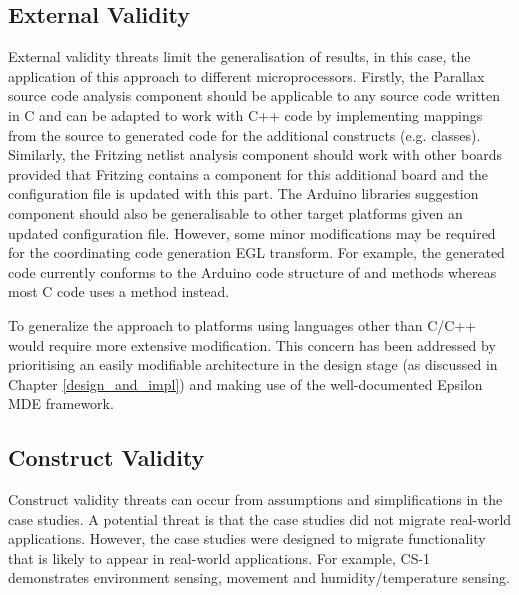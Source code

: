 \documentclass{UoYCSproject}
\begin{document}
\subsection{External Validity}
External validity threats limit the generalisation of results, in this case, the application of this approach to different microprocessors. Firstly, the Parallax source code analysis component should be applicable to any source code written in C and can be adapted to work with C++ code by implementing mappings from the source to generated code for the additional constructs (e.g. classes). Similarly, the Fritzing netlist analysis component should work with other boards provided that Fritzing contains a component for this additional board and the configuration file is updated with this part. The Arduino libraries suggestion component should also be generalisable to other target platforms given an updated configuration file. However, some minor modifications may be required for the coordinating code generation EGL transform. For example, the generated code currently conforms to the Arduino code structure of  and  methods whereas most C code uses a  method instead.

To generalize the approach to platforms using languages other than C/C++ would require more extensive modification. This concern has been addressed by prioritising an easily modifiable architecture in the design stage (as discussed in Chapter \ref{design_and_impl}) and making use of the well-documented Epsilon MDE framework.

\subsection{Construct Validity} \label{construct_validity}
Construct validity threats can occur from assumptions and simplifications in the case studies. A potential threat is that the case studies did not migrate real-world applications. However, the case studies were designed to migrate functionality that is likely to appear in real-world applications. For example, CS-1 demonstrates environment sensing, movement and humidity/temperature sensing.
\end{document}
